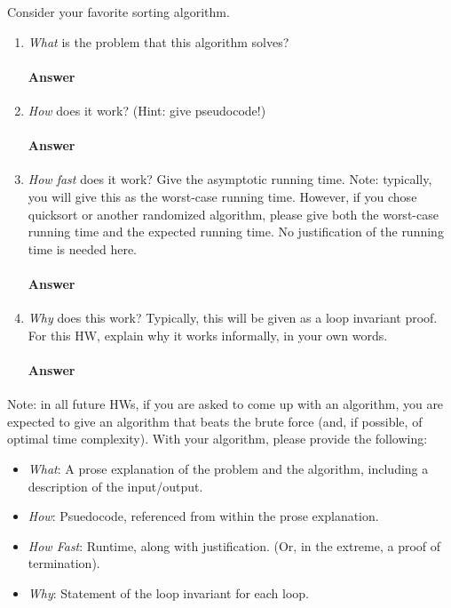 \documentclass{article}
\begin{document}
\collab{\todo{}}
Consider your favorite sorting algorithm.
\begin{enumerate}
    \item \emph{What} is the problem that this algorithm solves?

        \paragraph{Answer}
        \todo{}

    \item \emph{How} does it work? (Hint: give pseudocode!)

        \paragraph{Answer}
        \todo{}

    \item \emph{How fast} does it work?  Give the asymptotic running time.
        Note: typically, you will give this as the worst-case running time.
        However, if you chose quicksort or another randomized algorithm, please
        give both the worst-case running time and the expected running time.  No
        justification of the running time is needed here.

        \paragraph{Answer}
        \todo{}

    \item \emph{Why} does this work? Typically, this will be given as a loop
        invariant proof.  For this HW, explain why it works informally, in your
        own words.

        \paragraph{Answer}
        \todo{}

\end{enumerate}

Note: in all future HWs, if you are asked to come up with an algorithm, you are
expected to give an algorithm that beats the brute force (and, if possible, of
optimal time complexity). With your algorithm, please provide the following:
\begin{itemize}
    \item \emph{What}: A prose explanation of the problem and the algorithm,
        including a description of the input/output.
    \item \emph{How}: Psuedocode, referenced from within the prose explanation.
    \item \emph{How Fast}: Runtime, along with justification.  (Or, in the
        extreme, a proof of termination).
    \item \emph{Why}: Statement of the loop invariant for each loop.
\end{itemize}
\end{document}
